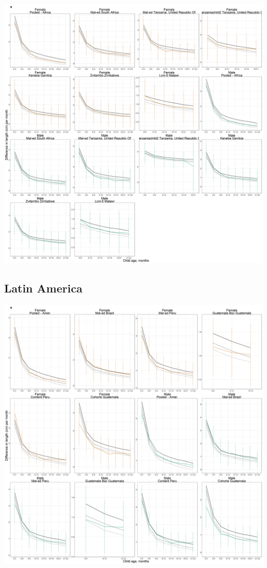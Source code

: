 \documentclass[9pt,]{book}
\begin{document}
\includegraphics[width=75in]{figure-copies/fig-length-2-length_vel-cohort-africa-allage-primary}

\hypertarget{latin-america-3}{%
\subsection{Latin America}\label{latin-america-3}}

\includegraphics[width=75in]{figure-copies/fig-length-2-length_vel-cohort-latamer-allage-primary}
\end{document}
